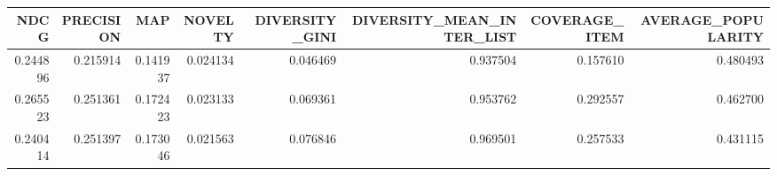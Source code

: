 \begin{tabular}{rrrrrrrr}
\toprule
    NDCG &  PRECISION &      MAP &  NOVELTY &  DIVERSITY\_GINI &  DIVERSITY\_MEAN\_INTER\_LIST &  COVERAGE\_ITEM &  AVERAGE\_POPULARITY \\
\midrule
0.244896 &   0.215914 & 0.141937 & 0.024134 &        0.046469 &                   0.937504 &       0.157610 &            0.480493 \\
0.265523 &   0.251361 & 0.172423 & 0.023133 &        0.069361 &                   0.953762 &       0.292557 &            0.462700 \\
0.240414 &   0.251397 & 0.173046 & 0.021563 &        0.076846 &                   0.969501 &       0.257533 &            0.431115 \\
\bottomrule
\end{tabular}
